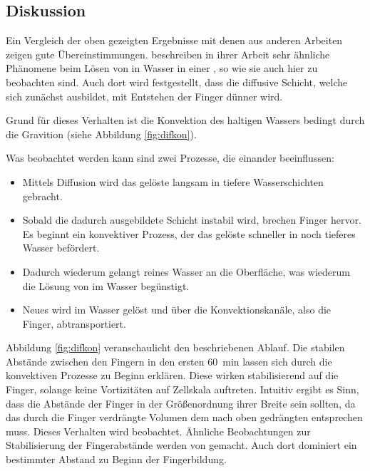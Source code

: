 \subsection{Diskussion}
\label{res:cot:disk}

Ein Vergleich der oben gezeigten Ergebnisse mit denen aus anderen Arbeiten zeigen gute Übereinstimmungen.
\mbox{\citet{kneafsy}} beschreiben in ihrer Arbeit sehr ähnliche Phänomene beim Lösen von \COT in Wasser in einer \HSCn, so wie sie auch hier zu beobachten sind. Auch dort wird festgestellt, dass die diffusive Schicht, welche sich zunächst ausbildet, mit Entstehen der Finger dünner wird.

Grund für dieses Verhalten ist die Konvektion des \COTm haltigen Wassers bedingt durch die Gravition (siehe Abbildung \ref{fig:difkon}). 

Was beobachtet werden kann sind zwei Prozesse, die einander beeinflussen: 
\begin{itemize}
 \item Mittels Diffusion wird das gelöste \COT langsam in tiefere Wasserschichten gebracht.
 \item Sobald die dadurch ausgebildete Schicht instabil wird, brechen Finger hervor. Es beginnt ein konvektiver Prozess, der das gelöste \COT schneller in noch tieferes Wasser befördert.
 \item Dadurch wiederum gelangt reines Wasser an die Oberfläche, was wiederum die Lösung von \COT im Wasser begünstigt.
 \item Neues \COT wird im Wasser gelöst und über die Konvektionskanäle, also die Finger, abtransportiert.
\end{itemize}

Abbildung \ref{fig:difkon} veranschaulicht den beschriebenen Ablauf.
Die stabilen Abstände zwischen den Fingern in den ersten \SI{60}{\minute} lassen sich durch die konvektiven Prozesse zu Beginn erklären. Diese wirken stabilisierend auf die Finger, solange keine Vortizitäten auf Zellskala auftreten.
Intuitiv ergibt es Sinn, dass die Abstände der Finger in der Größenordnung ihrer Breite sein sollten, da das durch die Finger verdrängte Volumen dem nach oben gedrängten entsprechen muss. Dieses Verhalten wird beobachtet.
Ähnliche Beobachtungen zur Stabilisierung der Fingerabstände werden von \cite{fernandez} gemacht. Auch dort dominiert ein bestimmter Abstand zu Beginn der Fingerbildung. 

